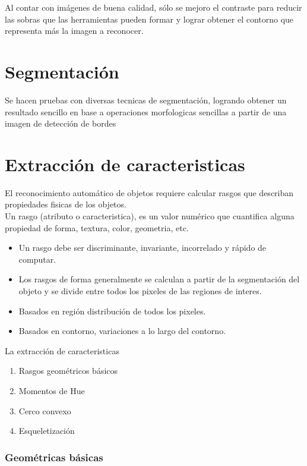 \documentclass[a4paper, 11pt]{article}
\begin{document}
Al contar con imágenes de buena calidad, sólo se mejoro el contraste para reducir las sobras que las herramientas pueden formar y lograr obtener el contorno que representa más la imagen a reconocer.

\section{Segmentación}

Se hacen pruebas con diversas tecnicas de segmentación, logrando obtener un resultado sencillo en base a operaciones morfologicas sencillas a partir de una imagen de detección de bordes

\section{Extracción de caracteristicas}

El reconocimiento automático de objetos requiere calcular rasgos que describan propiedades fisicas de los objetos.\\

Un rasgo (atributo o caracteristica), es un valor numérico que cuantifica alguna propiedad de forma, textura, color, geometria, etc.

\begin{itemize}
\item Un rasgo debe ser discriminante, invariante, incorrelado y rápido de computar.
\item Los rasgos de forma generalmente se calculan a partir de la segmentación del objeto y se divide entre todos los pixeles de las regiones de interes.
\item Basados en región distribución de todos los pixeles.
\item Basados en contorno, variaciones a lo largo del contorno.
\end{itemize}

La extracción de caracteristicas

\begin{enumerate}
\item Rasgos geométricos básicos
\item Momentos de Hue
\item Cerco convexo
\item Esqueletización
\end{enumerate}

\subsubsection{Geométricas básicas}
\end{document}
